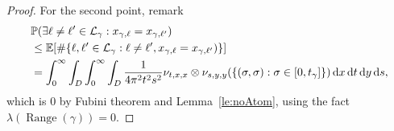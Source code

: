 \documentclass[11pt]{article}
\def\d{\,{\rm d}}
\DeclareMathOperator{\Range}{Range}
\begin{document}
\begin{proof}
  For the second point, remark
    \begin{align}
        &\mathbb{P}(\exists \ell\neq \ell'  \in \mathcal{L}_\gamma: x_{\gamma,\ell}=x_{\gamma,\ell'} ) \nonumber\\
        &\leq \mathbb{E}[ \#
        \{ \ell, \ell'  \in \mathcal{L}_\gamma: \ell\neq \ell',  x_{\gamma,\ell}=x_{\gamma,\ell'} ) \}]\nonumber\\
        &= \int_0^\infty \int_D \int_0^\infty \int_D  \frac{1}{4 \pi^2 t^2 s^2}
        \nu_{t,x,x}\otimes \nu_{s,y,y} (\{(\sigma,\sigma): \sigma\in [0,t_\gamma] \}) \d x \d t \d y \d s  , \label{eq:temp:iszero}
    \end{align}
    which is $0$ by Fubini theorem and Lemma~\ref{le:noAtom}, using the fact $\lambda(\Range(\gamma))=0$.
\end{proof}
\end{document}

